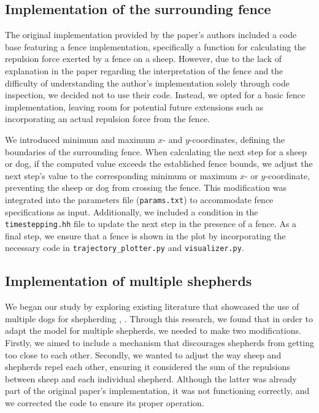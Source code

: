 \subsection{Implementation of the surrounding fence}
The original implementation provided by the paper's authors included a code base featuring a fence implementation, specifically a function for calculating the repulsion force exerted by a fence on a sheep. However, due to the lack of explanation in the paper regarding the interpretation of the fence and the difficulty of understanding the author's implementation solely through code inspection, we decided not to use their code. Instead, we opted for a basic fence implementation, leaving room for potential future extensions such as incorporating an actual repulsion force from the fence.

We introduced minimum and maximum $x$- and $y$-coordinates, defining the boundaries of the surrounding fence. When calculating the next step for a sheep or dog, if the computed value exceeds the established fence bounds, we adjust the next step's value to the corresponding minimum or maximum $x$- or $y$-coordinate, preventing the sheep or dog from crossing the fence. This modification was integrated into the parameters file (\texttt{params.txt}) to accommodate fence specifications as input. Additionally, we included a condition in the \texttt{timestepping.hh} file to update the next step in the presence of a fence. As a final step, we ensure that a fence is shown in the plot by incorporating the necessary code in \texttt{trajectory\_plotter.py} and \texttt{visualizer.py}.

\subsection{Implementation of multiple shepherds}
We began our study by exploring existing literature that showcased the use of multiple dogs for shepherding \cite{kubo2022herd}, \cite{baxter2021simulating}. Through this research, we found that in order to adapt the model for multiple shepherds, we needed to make two modifications. Firstly, we aimed to include a mechanism that discourages shepherds from getting too close to each other. Secondly, we wanted to adjust the way sheep and shepherds repel each other, ensuring it considered the sum of the repulsions between sheep and each individual shepherd. Although the latter was already part of the original paper's implementation, it was not functioning correctly, and we corrected the code to ensure its proper operation.

